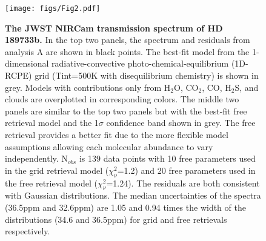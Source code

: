 \documentclass[sn-standardnature]{sn-jnl}%
\begin{document}
\begin{figure}[h!]
\centering
  \texttt{[image: figs/Fig2.pdf]}
  \caption{\textbf{The JWST NIRCam transmission spectrum of HD 189733b.} In the top two panels, the spectrum and residuals from analysis A are shown in black points. The best-fit model from the 1-dimensional radiative-convective photo-chemical-equilibrium (1D-RCPE) grid (Tint=500K with disequilibrium chemistry) is shown in grey. Models with contributions only from H$_2$O, CO$_2$, CO, H$_2$S, and clouds are overplotted in corresponding colors. The middle two panels are similar to the top two panels but with the best-fit free retrieval model and the 1$\sigma$ confidence band shown in grey. The free retrieval provides a better fit due to the more flexible model assumptions allowing each molecular abundance to vary independently. N$_{obs}$ is 139 data points with 10 free parameters used in the grid retrieval model ($\chi^2_{\nu}$=1.2) and 20 free parameters used in the free retrieval model ($\chi^2_{\nu}$=1.24). The residuals are both consistent with Gaussian distributions. The median uncertainties of the spectra (36.5ppm and 32.6ppm) are 1.05 and 0.94 times the width of the distributions (34.6 and 36.5ppm) for grid and free retrievals respectively.}
  \label{fig:fig2}
\end{figure}
\end{document}
